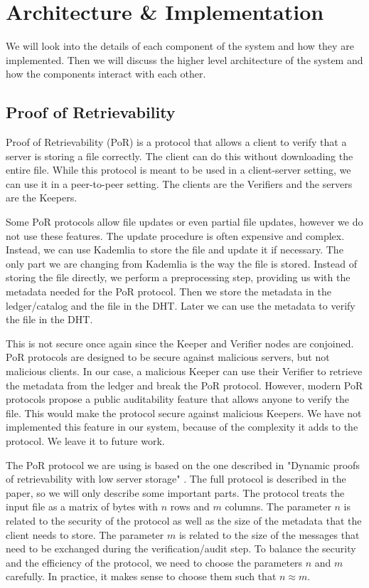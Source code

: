 \chapter{Architecture \& Implementation}
\label{chap:implementation}

We will look into the details of each component of the system and how they are implemented.
Then we will discuss the higher level architecture of the system and how the components interact with each other.

\section{Proof of Retrievability}

Proof of Retrievability\cite{porfirst} (PoR) is a protocol that allows a client to verify that a server is storing a file correctly.
The client can do this without downloading the entire file.
While this protocol is meant to be used in a client-server setting, we can use it in a peer-to-peer setting.
The clients are the Verifiers and the servers are the Keepers.

Some PoR protocols allow file updates or even partial file updates, however we do not use these features.
The update procedure is often expensive and complex.
Instead, we can use Kademlia to store the file and update it if necessary.
The only part we are changing from Kademlia is the way the file is stored.
Instead of storing the file directly, we perform a preprocessing step, providing us with the metadata needed for the PoR protocol.
Then we store the metadata in the ledger/catalog and the file in the DHT.
Later we can use the metadata to verify the file in the DHT.

This is not secure once again since the Keeper and Verifier nodes are conjoined.
PoR protocols are designed to be secure against malicious servers, but not malicious clients.
In our case, a malicious Keeper can use their Verifier to retrieve the metadata from the ledger and break the PoR protocol.
However, modern PoR protocols propose a public auditability feature that allows anyone to verify the file.
This would make the protocol secure against malicious Keepers.
We have not implemented this feature in our system, because of the complexity it adds to the protocol.
We leave it to future work.

The PoR protocol we are using is based on the one described in "Dynamic proofs of retrievability with low server storage" \cite{poralgebra}.
The full protocol is described in the paper, so we will only describe some important parts.
The protocol treats the input file as a matrix of bytes with $n$ rows and $m$ columns.
The parameter $n$ is related to the security of the protocol as well as the size of the metadata that the client needs to store.
The parameter $m$ is related to the size of the messages that need to be exchanged during the verification/audit step.
To balance the security and the efficiency of the protocol, we need to choose the parameters $n$ and $m$ carefully.
In practice, it makes sense to choose them such that $n \approx m$.

